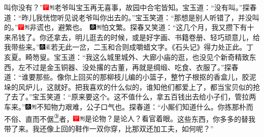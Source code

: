 叫你没有？''{\includegraphics[width=3mm]{../Images/00002}\includegraphics[width=3mm]{../Images/00011}\footnotesize \kaishu 老爷叫宝玉再无喜事，故园中合宅皆知。}宝玉道：``没有叫。''探春道：``昨儿我恍惚听见说老爷叫你出去的。''宝玉笑道：``那想是别人听错了，并没叫的。''{\includegraphics[width=3mm]{../Images/00002}\includegraphics[width=3mm]{../Images/00011}\footnotesize \kaishu 非谎也，避繁也。　\includegraphics[width=3mm]{../Images/00004}\includegraphics[width=3mm]{../Images/00011}\footnotesize \kaishu 怕文繁。}探春又笑道：``这几个月，我又攒下有十来吊钱了。你还拿去，明儿逛去的时候，或是好字画、书籍卷册、轻巧顽意儿，给我带些来。''{\includegraphics[width=3mm]{../Images/00004}\includegraphics[width=3mm]{../Images/00010}\footnotesize \kaishu 若无此一岔，二玉和合则成嚼蜡文字。《石头记》得力处正此。丁亥夏。畸笏叟。}宝玉道：``我这么城里城外、大廊小庙的逛，也没见个新奇精致东西，左不过是金玉铜器、没处撂的古董，再就是绸缎、吃食、衣服了。''探春道：``谁要那些。像你上回买的那柳枝儿编的小篮子，整竹子根抠的香盒儿，胶泥垛的风炉儿，这就好。把我喜欢的什么似的，谁知他们都爱上了，都当宝贝似的抢了去了。''宝玉笑道：``原来要这个。这不值什么，拿五百钱出去给小子们，管拉两车来。''{\includegraphics[width=3mm]{../Images/00004}\includegraphics[width=3mm]{../Images/00011}\footnotesize \kaishu 不知物力艰难，公子口气也。}探春道：``小厮们知道什么。你拣那朴而不俗、直而不倨\href{../Text/part0031_split_000.html\#lnkback_3_a}{\textsuperscript{③}}者，{\includegraphics[width=3mm]{../Images/00002}\includegraphics[width=3mm]{../Images/00011}\footnotesize \kaishu 是论物？是论人？看官着眼。}这些东西，你多多的替我带了来。我还像上回的鞋作一双你穿，比那双还加工夫，如何呢？''

